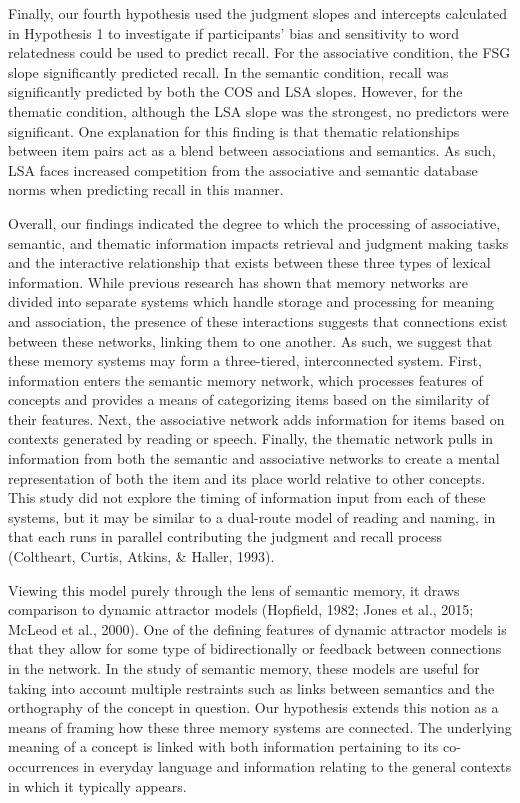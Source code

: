 \documentclass[english,man]{apa6}
\theoremstyle{definition}
\theoremstyle{definition}
\theoremstyle{definition}
\theoremstyle{remark}
\begin{document}
Finally, our fourth hypothesis used the judgment slopes and intercepts
calculated in Hypothesis 1 to investigate if participants' bias and
sensitivity to word relatedness could be used to predict recall. For the
associative condition, the FSG slope significantly predicted recall. In
the semantic condition, recall was significantly predicted by both the
COS and LSA slopes. However, for the thematic condition, although the
LSA slope was the strongest, no predictors were significant. One
explanation for this finding is that thematic relationships between item
pairs act as a blend between associations and semantics. As such, LSA
faces increased competition from the associative and semantic database
norms when predicting recall in this manner.

Overall, our findings indicated the degree to which the processing of
associative, semantic, and thematic information impacts retrieval and
judgment making tasks and the interactive relationship that exists
between these three types of lexical information. While previous
research has shown that memory networks are divided into separate
systems which handle storage and processing for meaning and association,
the presence of these interactions suggests that connections exist
between these networks, linking them to one another. As such, we suggest
that these memory systems may form a three-tiered, interconnected
system. First, information enters the semantic memory network, which
processes features of concepts and provides a means of categorizing
items based on the similarity of their features. Next, the associative
network adds information for items based on contexts generated by
reading or speech. Finally, the thematic network pulls in information
from both the semantic and associative networks to create a mental
representation of both the item and its place world relative to other
concepts. This study did not explore the timing of information input
from each of these systems, but it may be similar to a dual-route model
of reading and naming, in that each runs in parallel contributing the
judgment and recall process (Coltheart, Curtis, Atkins, \& Haller,
1993).

Viewing this model purely through the lens of semantic memory, it draws
comparison to dynamic attractor models (Hopfield, 1982; Jones et al.,
2015; McLeod et al., 2000). One of the defining features of dynamic
attractor models is that they allow for some type of bidirectionally or
feedback between connections in the network. In the study of semantic
memory, these models are useful for taking into account multiple
restraints such as links between semantics and the orthography of the
concept in question. Our hypothesis extends this notion as a means of
framing how these three memory systems are connected. The underlying
meaning of a concept is linked with both information pertaining to its
co-occurrences in everyday language and information relating to the
general contexts in which it typically appears.
\end{document}
